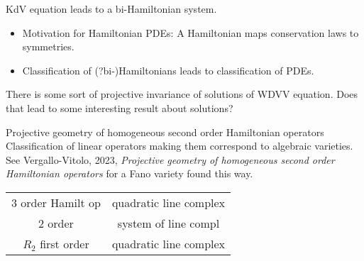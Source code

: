 \begin{example}
KdV equation leads to a bi-Hamiltonian system.
\end{example}

\begin{itemize}
	\item Motivation for Hamiltonian PDEs: A Hamiltonian maps conservation laws to symmetries.

\item Classification of (?bi-)Hamiltonians leads to classification of PDEs.
\end{itemize}

\begin{remark}
	There is some sort of projective invariance of solutions of WDVV equation. Does that lead to some interesting result about solutions?
\end{remark}

Projective geometry of homogeneous second order Hamiltonian operators
Classification of linear operators making them correspond to algebraic varieties. See Vergallo-Vitolo, 2023, \textit{Projective geometry of homogeneous second order Hamiltonian operators} for a Fano variety found this way.

\begin{table}[H]
	\centering
	\begin{tabular}{c| c}
		3 order Hamilt op & quadratic line complex\\
	2 order & system of line compl\\
	$R_2$ first order &quadratic line complex
	\end{tabular}
\end{table}


